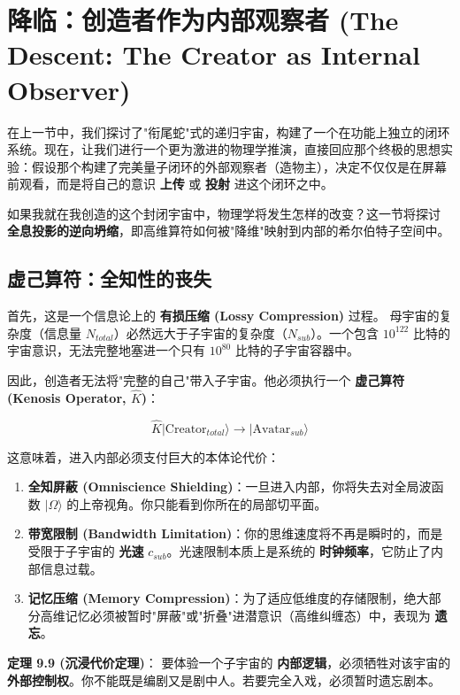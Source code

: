 \section{降临：创造者作为内部观察者 (The Descent: The Creator as Internal Observer)}

在上一节中，我们探讨了"衔尾蛇"式的递归宇宙，构建了一个在功能上独立的闭环系统。现在，让我们进行一个更为激进的物理学推演，直接回应那个终极的思想实验：假设那个构建了完美量子闭环的外部观察者（造物主），决定不仅仅是在屏幕前观看，而是将自己的意识 \textbf{上传} 或 \textbf{投射} 进这个闭环之中。

如果我就在我创造的这个封闭宇宙中，物理学将发生怎样的改变？这一节将探讨 \textbf{全息投影的逆向坍缩}，即高维算符如何被"降维"映射到内部的希尔伯特子空间中。

\subsection{虚己算符：全知性的丧失}

首先，这是一个信息论上的 \textbf{有损压缩 (Lossy Compression)} 过程。
母宇宙的复杂度（信息量 $N_{total}$）必然远大于子宇宙的复杂度（$N_{sub}$）。一个包含 $10^{122}$ 比特的宇宙意识，无法完整地塞进一个只有 $10^{80}$ 比特的子宇宙容器中。

因此，创造者无法将"完整的自己"带入子宇宙。他必须执行一个 \textbf{虚己算符 (Kenosis Operator, $\hat{K}$)}：

\[\hat{K} | \text{Creator}_{total} \rangle \to | \text{Avatar}_{sub} \rangle\]

这意味着，进入内部必须支付巨大的本体论代价：
\begin{enumerate}
\item \textbf{全知屏蔽 (Omniscience Shielding)}：一旦进入内部，你将失去对全局波函数 $|\Omega\rangle$ 的上帝视角。你只能看到你所在的局部切平面。
\item \textbf{带宽限制 (Bandwidth Limitation)}：你的思维速度将不再是瞬时的，而是受限于子宇宙的 \textbf{光速} $c_{sub}$。光速限制本质上是系统的 \textbf{时钟频率}，它防止了内部信息过载。
\item \textbf{记忆压缩 (Memory Compression)}：为了适应低维度的存储限制，绝大部分高维记忆必须被暂时"屏蔽"或"折叠"进潜意识（高维纠缠态）中，表现为 \textbf{遗忘}。
\end{enumerate}

\textbf{定理 9.9 (沉浸代价定理)}：
要体验一个子宇宙的 \textbf{内部逻辑}，必须牺牲对该宇宙的 \textbf{外部控制权}。你不能既是编剧又是剧中人。若要完全入戏，必须暂时遗忘剧本。

